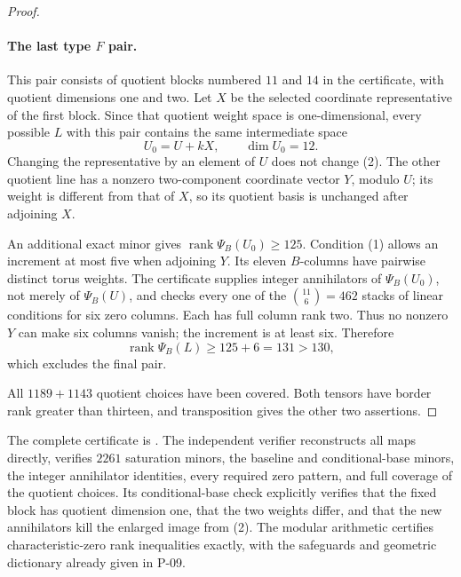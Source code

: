 \begin{proof}
\paragraph{The last type \(F\) pair.}
This pair consists of quotient blocks numbered \(11\)
and \(14\) in the certificate, with quotient dimensions
one and two. Let \(X\) be the selected coordinate
representative of the first block. Since that quotient
weight space is one-dimensional, every possible \(L\)
with this pair contains the same intermediate space
\[
 U_0=U+kX,\qquad \dim U_0=12.
 \tag{2}
\]
Changing the representative by an element of \(U\)
does not change (2). The other quotient line has a
nonzero two-component coordinate vector \(Y\), modulo
\(U\); its weight is different from that of \(X\), so
its quotient basis is unchanged after adjoining \(X\).

An additional exact minor gives
\(\operatorname{rank}\Psi_B(U_0)\geq125\).
Condition (1) allows an increment at most five when
adjoining \(Y\). Its eleven \(B\)-columns have pairwise
distinct torus weights. The certificate supplies
integer annihilators of \(\Psi_B(U_0)\), not merely
of \(\Psi_B(U)\), and checks every one of the
\(\binom{11}{6}=462\) stacks of linear conditions for
six zero columns. Each has full column rank two.
Thus no nonzero \(Y\) can make six columns vanish;
the increment is at least six. Therefore
\[
 \operatorname{rank}\Psi_B(L)\geq125+6=131>130,
\]
which excludes the final pair.

All \(1189+1143\) quotient choices have been covered.
Both tensors have border rank greater than thirteen,
and transposition gives the other two assertions.
\end{proof}

The complete certificate is
.
The independent verifier
 reconstructs all
maps directly, verifies \(2261\) saturation minors,
the baseline and conditional-base minors, the integer
annihilator identities, every required zero pattern,
and full coverage of the quotient choices. Its
conditional-base check explicitly verifies that the
fixed block has quotient dimension one, that the two
weights differ, and that the new annihilators kill
the enlarged image from (2).
The modular arithmetic certifies characteristic-zero
rank inequalities exactly, with the safeguards and
geometric dictionary already given in P-09.
